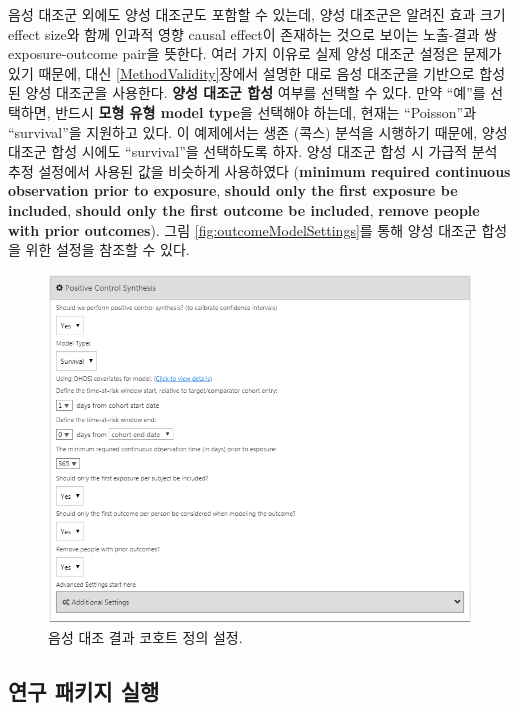 \documentclass[10.5pt]{book}
\theoremstyle{definition}
\theoremstyle{definition}
\theoremstyle{definition}
\theoremstyle{remark}
\begin{document}
음성 대조군 외에도 양성 대조군도 포함할 수 있는데, 양성 대조군은 알려진
효과 크기 effect size와 함께 인과적 영향 causal effect이 존재하는 것으로
보이는 노출-결과 쌍 exposure-outcome pair을 뜻한다. 여러 가지 이유로
실제 양성 대조군 설정은 문제가 있기 때문에, 대신
\ref{MethodValidity}장에서 설명한 대로 음성 대조군을 기반으로 합성된
양성 대조군을 사용한다. \textbf{양성 대조군 합성} 여부를 선택할 수 있다.
만약 ``예''를 선택하면, 반드시 \textbf{모형 유형 model type}을 선택해야
하는데, 현재는 ``Poisson''과 ``survival''을 지원하고 있다. 이 예제에서는
생존 (콕스) 분석을 시행하기 때문에, 양성 대조군 합성 시에도
``survival''을 선택하도록 하자. 양성 대조군 합성 시 가급적 분석 추정
설정에서 사용된 값을 비슷하게 사용하였다 (\textbf{minimum required
continuous observation prior to exposure}, \textbf{should only the first
exposure be included}, \textbf{should only the first outcome be
included}, \textbf{remove people with prior outcomes}). 그림
\ref{fig:outcomeModelSettings}를 통해 양성 대조군 합성을 위한 설정을
참조할 수 있다.

\begin{figure}

{\centering \includegraphics[width=1\linewidth]{images/PopulationLevelEstimation/pcSynthesis} 

}

\caption{음성 대조 결과 코호트 정의 설정.}\label{fig:pcSynthesis}
\end{figure}

\subsection{연구 패키지 실행}\label{--}
\end{document}

